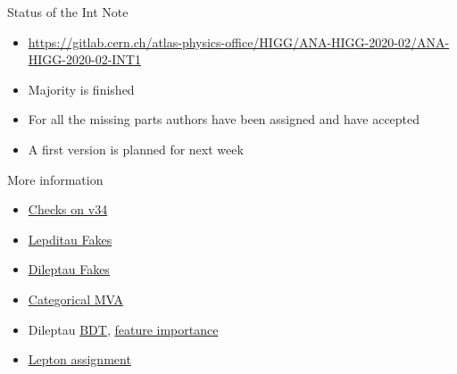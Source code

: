 \begin{frame}{Status of the Int Note}
    \begin{itemize}
        \item \url{https://gitlab.cern.ch/atlas-physics-office/HIGG/ANA-HIGG-2020-02/ANA-HIGG-2020-02-INT1}
        \item Majority is finished
        \item For all the missing parts authors have been assigned and have accepted
        \item A first version is planned for next week
    \end{itemize}
\end{frame}

\begin{frame}{More information}
    \begin{itemize}
        \item \href{https://indico.cern.ch/event/1073925/contributions/4516262/attachments/2338336/3986788/14-10-21_overview.pdf}{Checks on v34}
        \item \href{https://indico.cern.ch/event/1073925/contributions/4516262/attachments/2338336/3993194/TauFakes_lep2tau.pdf}{Lepditau Fakes}        
        \item \href{https://indico.cern.ch/event/1073925/contributions/4516262/attachments/2338336/3986886/dileptau_fakes.pdf}{Dileptau Fakes}
        \item \href{https://indico.cern.ch/event/1073925/contributions/4516262/attachments/2338336/3993953/categorical_MVA.pdf}{Categorical MVA}
        \item Dileptau \href{https://indico.cern.ch/event/1073925/contributions/4516262/attachments/2340922/3993860/tHq_2L1Tau_v34_BDTstatus.pdf}{BDT}, \href{https://indico.cern.ch/event/1073925/contributions/4516262/attachments/2340922/3993071/FeatureOptimise.pdf}{feature importance} 
        \item \href{https://indico.cern.ch/event/1073925/contributions/4516262/attachments/2338336/3990127/LeptonAssignment_Reco_3.pdf}{Lepton assignment}
    \end{itemize}
\end{frame}